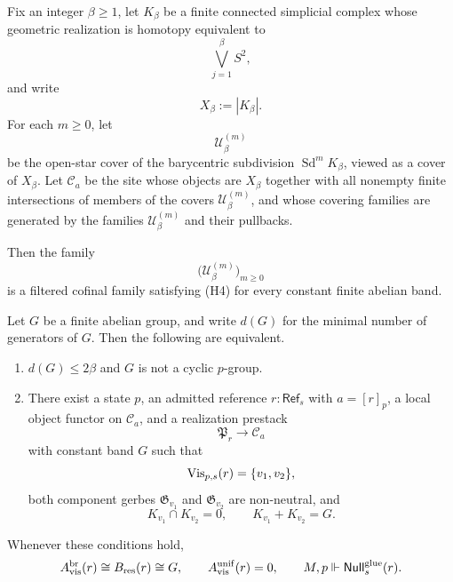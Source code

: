 \begin{theorem}\label{thm:bouquet-two-branch-resolution}
Fix an integer $\beta\ge 1$, let $K_\beta$ be a finite connected simplicial complex whose geometric realization is homotopy equivalent to
\[
\bigvee_{j=1}^{\beta} S^2,
\]
and write
\[
X_\beta:=|K_\beta|.
\]
For each $m\ge 0$, let
\[
\mathcal U_\beta^{(m)}
\]
be the open-star cover of the barycentric subdivision $\operatorname{Sd}^m K_\beta$, viewed as a cover of $X_\beta$. Let $\mathcal C_a$ be the site whose objects are $X_\beta$ together with all nonempty finite intersections of members of the covers $\mathcal U_\beta^{(m)}$, and whose covering families are generated by the families $\mathcal U_\beta^{(m)}$ and their pullbacks.

Then the family
\[
\bigl(\mathcal U_\beta^{(m)}\bigr)_{m\ge 0}
\]
is a filtered cofinal family satisfying \textup{(H4)} for every constant finite abelian band.

Let $G$ be a finite abelian group, and write $d(G)$ for the minimal number of generators of $G$. Then the following are equivalent.
\begin{enumerate}[label=(\roman*),nosep]
\item $d(G)\le 2\beta$ and $G$ is not a cyclic $p$-group.
\item There exist a state $p$, an admitted reference $r:\mathsf{Ref}_s$ with $a=[r]_p$, a local object functor on $\mathcal C_a$, and a realization prestack
\[
\mathfrak P_r\to \mathcal C_a
\]
with constant band $G$ such that
\[
\mathrm{Vis}_{p,s}(r)=\{v_1,v_2\},
\]
both component gerbes $\mathfrak G_{v_1}$ and $\mathfrak G_{v_2}$ are non-neutral, and
\[
K_{v_1}\cap K_{v_2}=0,
\qquad
K_{v_1}+K_{v_2}=G.
\]
\end{enumerate}
Whenever these conditions hold,
\[
A_{\mathrm{vis}}^{\mathrm{br}}(r)\cong B_{\mathrm{res}}(r)\cong G,
\qquad
A_{\mathrm{vis}}^{\mathrm{unif}}(r)=0,
\qquad
M,p\Vdash \mathsf{Null}_s^{\mathrm{glue}}(r).
\]
\end{theorem}

